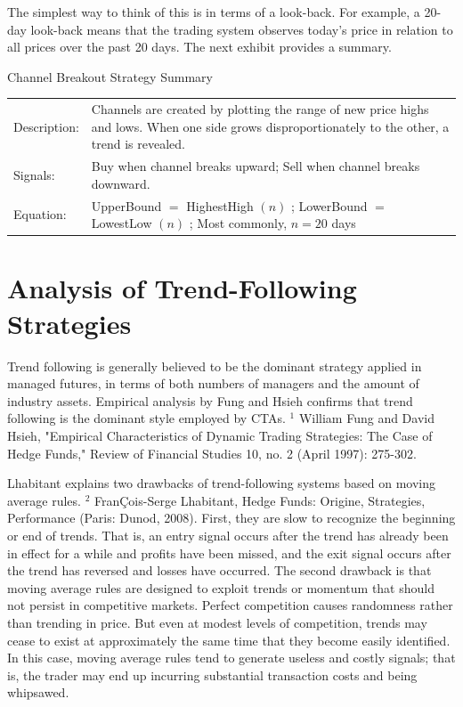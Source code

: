 \documentclass[11pt]{article}
\begin{document}
The simplest way to think of this is in terms of a look-back. For example, a 20-day look-back means that the trading system observes today's price in relation to all prices over the past 20 days. The next exhibit provides a summary.

Channel Breakout Strategy Summary

\begin{center}
\begin{tabular}{|ll|}
\hline
Description: & Channels are created by plotting the range of new price highs and lows. When one side grows disproportionately to the other, a trend is revealed. \\
Signals: & Buy when channel breaks upward;  Sell when channel breaks downward. \\
Equation: & UpperBound $=$ HighestHigh $(n)$ ; LowerBound $=$ LowestLow $(n)$ ; Most commonly, $n=20$ days \\
\end{tabular}
\end{center}

\section*{Analysis of Trend-Following Strategies}
Trend following is generally believed to be the dominant strategy applied in managed futures, in terms of both numbers of managers and the amount of industry assets. Empirical analysis by Fung and Hsieh confirms that trend following is the dominant style employed by CTAs. ${ }^{1}$ William Fung and David Hsieh, "Empirical Characteristics of Dynamic Trading Strategies: The Case of Hedge Funds," Review of Financial Studies 10, no. 2 (April 1997): 275-302.

Lhabitant explains two drawbacks of trend-following systems based on moving average rules. ${ }^{2}$ FranÇois-Serge Lhabitant, Hedge Funds: Origine, Strategies, Performance (Paris: Dunod, 2008). First, they are slow to recognize the beginning or end of trends. That is, an entry signal occurs after the trend has already been in effect for a while and profits have been missed, and the exit signal occurs after the trend has reversed and losses have occurred. The second drawback is that moving average rules are designed to exploit trends or momentum that should not persist in competitive markets. Perfect competition causes randomness rather than trending in price. But even at modest levels of competition, trends may cease to exist at approximately the same time that they become easily identified. In this case, moving average rules tend to generate useless and costly signals; that is, the trader may end up incurring substantial transaction costs and being whipsawed.
\end{document}
